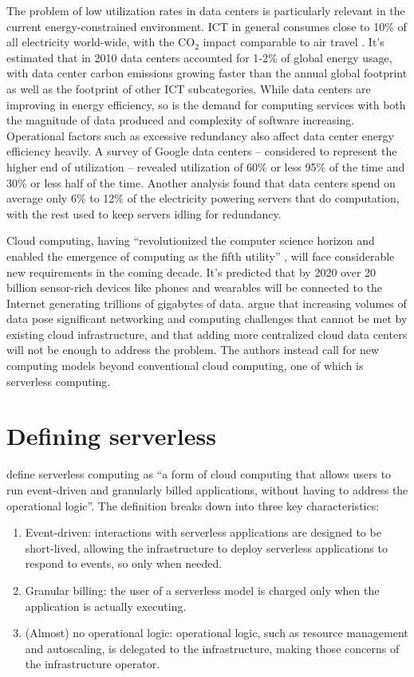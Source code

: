 The problem of low utilization rates in data centers is particularly relevant in the current energy-constrained environment. ICT in general consumes close to 10\% of all electricity world-wide, with the CO$_2$ impact comparable to air travel \parencite{buyya2017manifesto}. It's estimated that in 2010 data centers accounted for 1-2\% of global energy usage, with data center carbon emissions growing faster than the annual global footprint as well as the footprint of other ICT subcategories. While data centers are improving in energy efficiency, so is the demand for computing services with both the magnitude of data produced and complexity of software increasing. Operational factors such as excessive redundancy also affect data center energy efficiency heavily. A survey of Google data centers -- considered to represent the higher end of utilization -- revealed utilization of 60\% or less 95\% of the time and 30\% or less half of the time. Another analysis found that data centers spend on average only 6\% to 12\% of the electricity powering servers that do computation, with the rest used to keep servers idling for redundancy. \parencite{horner16powerusage}

Cloud computing, having ``revolutionized the computer science horizon and enabled the emergence of computing as the fifth utility'' \parencite{buyya2017manifesto}, will face considerable new requirements in the coming decade. It's predicted that by 2020 over 20 billion sensor-rich devices like phones and wearables will be connected to the Internet generating trillions of gigabytes of data. \textcite{varghese18next} argue that increasing volumes of data pose significant networking and computing challenges that cannot be met by existing cloud infrastructure, and that adding more centralized cloud data centers will not be enough to address the problem. The authors instead call for new computing models beyond conventional cloud computing, one of which is serverless computing.

\section{Defining serverless} \label{sec:definingServerless}

\textcite{van2017spec} define serverless computing as ``a form of cloud computing that allows users to run event-driven and granularly billed applications, without having to address the operational logic''. The definition breaks down into three key characteristics: \begin{enumerate}
  \item Event-driven: interactions with serverless applications are designed to be short-lived, allowing the infrastructure to deploy serverless applications to respond to events, so only when needed.
  \item Granular billing: the user of a serverless model is charged only when the application is actually executing.
  \item (Almost) no operational logic: operational logic, such as resource management and autoscaling, is delegated to the infrastructure, making those concerns of the infrastructure operator.
\end{enumerate}

